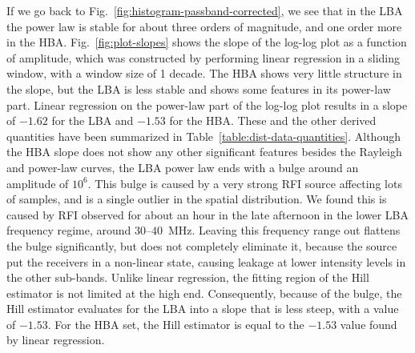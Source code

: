 \documentclass[useAMS,usenatbib]{mn2e}
\begin{document}
If we go back to Fig.~\ref{fig:histogram-passband-corrected}, we see that in the LBA the power law is stable for about three orders of magnitude, and one order more in the HBA. Fig.~\ref{fig:plot-slopes} shows the slope of the log-log plot as a function of amplitude, which was constructed by performing linear regression in a sliding window, with a window size of 1 decade. The HBA shows very little structure in the slope, but the LBA is less stable and shows some features in its power-law part. Linear regression on the power-law part of the log-log plot results in a slope of $-1.62$ for the LBA and $-1.53$ for the HBA. These and the other derived quantities have been summarized in Table~\ref{table:dist-data-quantities}. Although the HBA slope does not show any other significant features besides the Rayleigh and power-law curves, the LBA power law ends with a bulge around an amplitude of $10^6$. This bulge is caused by a very strong RFI source affecting lots of samples, and is a single outlier in the spatial distribution. We found this is caused by RFI observed for about an hour in the late afternoon in the lower LBA frequency regime, around $30$--$40$~MHz. Leaving this frequency range out flattens the bulge significantly, but does not completely eliminate it, because the source put the receivers in a non-linear state, causing leakage at lower intensity levels in the other sub-bands. Unlike linear regression, the fitting region of the Hill estimator is not limited at the high end. Consequently, because of the bulge, the Hill estimator evaluates for the LBA into a slope that is less steep, with a value of $-1.53$. For the HBA set, the Hill estimator is equal to the $-1.53$ value found by linear regression.
\end{document}
